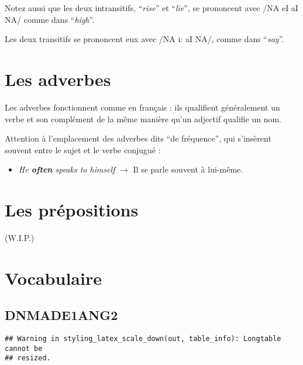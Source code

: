 \documentclass[
  10pt,
]{article}
\providecommand{\tightlist}{%
  \setlength{\itemsep}{0pt}\setlength{\parskip}{0pt}}
\begin{document}
Notez aussi que les deux intransitifs, ``\emph{rise}'' et ``\emph{lie}'', se prononcent avec /NA eI aI NA/ comme
dans ``\emph{high}''.

Les deux transitifs se prononcent eux avec /NA i: aI NA/, comme dans ``\emph{say}''.

\hypertarget{les-adverbes}{%
\section{Les adverbes}\label{les-adverbes}}

Les adverbes fonctionnent comme en français : ils qualifient généralement un verbe et son complément de la même manière qu'un adjectif qualifie un nom.

Attention à l'emplacement des adverbes dits ``de fréquence'', qui s'insèrent souvent entre le sujet et le verbe conjugué :

\begin{itemize}
\tightlist
\item
  \emph{He \textbf{often} speaks to himself} \(\rightarrow\) Il se parle souvent à lui-même.
\end{itemize}

\hypertarget{les-pruxe9positions}{%
\section{Les prépositions}\label{les-pruxe9positions}}

(W.I.P.)

\hypertarget{vocabulaire}{%
\section{Vocabulaire}\label{vocabulaire}}

\hypertarget{dnmade1ang2}{%
\subsection{DNMADE1ANG2}\label{dnmade1ang2}}

\begin{verbatim}
## Warning in styling_latex_scale_down(out, table_info): Longtable cannot be
## resized.
\end{verbatim}
\end{document}

